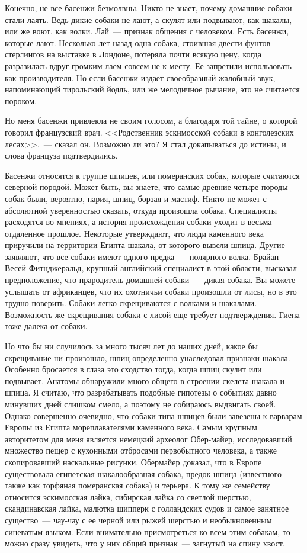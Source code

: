 \documentclass[12pt,a4paper,twoside,openany,svgnames]{memoir}
\begin{document}
Конечно, не все басенжи безмолвны. Никто не знает, почему домашние собаки стали лаять. Ведь дикие собаки не лают, а скулят или подвывают, как шакалы, или же воют, как волки. Лай~--- признак общения с человеком. Есть басенжи, которые лают. Несколько лет назад одна собака, стоившая двести фунтов стерлингов на выставке в Лондоне, потеряла почти всякую цену, когда разразилась вдруг громким лаем совсем не к месту. Ее запретили использовать как производителя. Но если басенжи издает своеобразный жалобный звук, напоминающий тирольский йодль, или же мелодичное рычание, это не считается пороком.

Но меня басенжи привлекла не своим голосом, а благодаря той тайне, о которой говорил французский врач. <<Родственник эскимосской собаки в конголезских лесах>>,~--- сказал он. Возможно ли это? Я стал докапываться до истины, и слова француза подтвердились.

Басенжи относятся к группе шпицев, или померанских собак, которые считаются северной породой. Может быть, вы знаете, что самые древние четыре породы собак были, вероятно, пария, шпиц, борзая и мастиф. Никто не может с абсолютной уверенностью сказать, откуда произошла собака. Специалисты расходятся во мнениях, а история происхождения собаки уходит в весьма отдаленное прошлое. Некоторые утверждают, что люди каменного века приручили на территории Египта шакала, от которого вывели шпица. Другие заявляют, что все собаки имеют одного предка~--- полярного волка. Брайан Весей-Фитцджеральд, крупный английский специалист в этой области, высказал предположение, что прародитель домашней собаки~--- дикая собака. Вы можете услышать от африканцев, что их охотничьи собаки произошли от лисы, но в это трудно поверить. Собаки легко скрещиваются с волками и шакалами. Возможность же скрещивания собаки с лисой еще требует подтверждения. Гиена тоже далека от собаки.

Но что бы ни случилось за много тысяч лет до наших дней, какое бы скрещивание ни произошло, шпиц определенно унаследовал признаки шакала. Особенно бросается в глаза это сходство тогда, когда шпиц скулит или подвывает. Анатомы обнаружили много общего в строении скелета шакала и шпица. Я считаю, что разрабатывать подобные гипотезы о событиях давно минувших дней слишком смело, а поэтому не собираюсь выдвигать своей. Однако совершенно очевидно, что собаки типа шпицев были завезены к варварам Европы из Египта мореплавателями каменного века. Самым крупным авторитетом для меня является немецкий археолог Обер-майер, исследовавший множество пещер с кухонными отбросами первобытного человека, а также скопировавший наскальные рисунки. Обермайер доказал, что в Европе существовала египетская шакалообразная собака, предок шпица (известного также как торфяная померанская собака) и терьера. К тому же семейству относится эскимосская лайка, сибирская лайка со светлой шерстью, скандинавская лайка, малютка шипперк с голландских судов и самое занятное существо~--- чау-чау с ее черной или рыжей шерстью и необыкновенным синеватым языком. Если внимательно присмотреться ко всем этим собакам, то можно сразу увидеть, что у них общий признак~--- загнутый на спину хвост.
\end{document}
